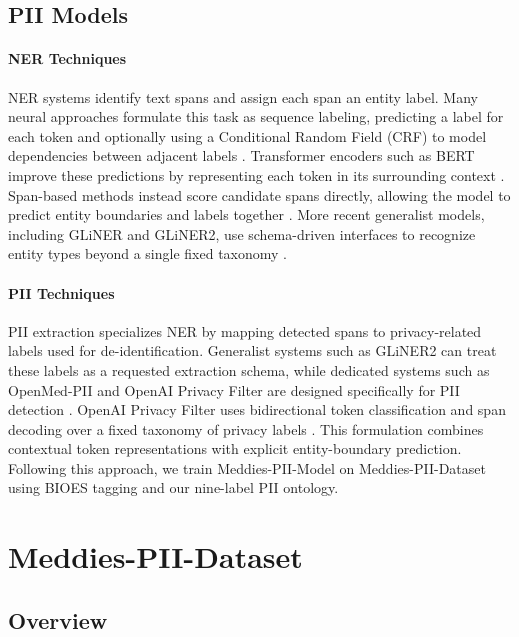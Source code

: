 \documentclass[11pt]{article}
\begin{document}
\subsection{PII Models}

\paragraph{NER Techniques}

NER systems identify text spans and assign each span an entity label. Many neural approaches formulate this task as sequence labeling, predicting a label for each token and optionally using a Conditional Random Field (CRF) to model dependencies between adjacent labels \cite{souza2019portuguese}. Transformer encoders such as BERT improve these predictions by representing each token in its surrounding context \cite{devlin2019bert}. Span-based methods instead score candidate spans directly, allowing the model to predict entity boundaries and labels together \cite{eberts2019span}. More recent generalist models, including GLiNER and GLiNER2, use schema-driven interfaces to recognize entity types beyond a single fixed taxonomy \cite{zaratiana2023gliner,zaratiana2025gliner2efficientmultitaskinformation}.

\paragraph{PII Techniques} PII extraction specializes NER by mapping detected spans to privacy-related labels used for de-identification. Generalist systems such as GLiNER2 can treat these labels as a requested extraction schema, while dedicated systems such as OpenMed-PII and OpenAI Privacy Filter are designed specifically for PII detection \cite{zaratiana2025gliner2efficientmultitaskinformation,openmed-pii-2026,openai2026privacyfilter}. OpenAI Privacy Filter uses bidirectional token classification and span decoding over a fixed taxonomy of privacy labels \cite{openai2026privacyfilter}. This formulation combines contextual token representations with explicit entity-boundary prediction. Following this approach, we train Meddies-PII-Model on Meddies-PII-Dataset using BIOES tagging and our nine-label PII ontology.


\section{Meddies-PII-Dataset}

\subsection{Overview}
\end{document}

